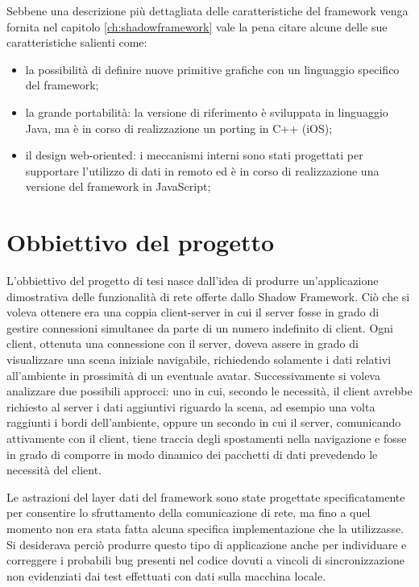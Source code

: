 Sebbene una descrizione pi\`u dettagliata delle caratteristiche del framework venga fornita nel capitolo \ref{ch:shadowframework} vale la pena citare alcune delle sue caratteristiche salienti come: 
\begin{itemize}
	\item  la possibilit\`a di definire nuove primitive grafiche con un linguaggio specifico del framework;
	\item  la grande portabilit\`a: la versione di riferimento \`e sviluppata in linguaggio Java, ma \`e in corso di realizzazione un porting in C++ (iOS);
	\item  il design web-oriented: i meccanismi interni sono stati progettati per supportare l'utilizzo di dati in remoto ed \`e in corso di realizzazione una versione del framework in JavaScript;
\end{itemize}

%
%
\section{Obbiettivo del progetto}
\label{sec:obbiettivo}
L'obbiettivo del progetto di tesi nasce dall'idea di produrre un'applicazione dimostrativa delle funzionalit\`a di rete offerte dallo Shadow Framework.
Ci\`o che si voleva ottenere era una coppia client-server in cui il server fosse in grado di gestire connessioni simultanee da parte di un numero indefinito di client. 
Ogni client, ottenuta una connessione con il server, doveva assere in grado di visualizzare una scena iniziale navigabile, richiedendo solamente i dati relativi all'ambiente in prossimit\`a di un eventuale avatar.
Successivamente si voleva analizzare due possibili approcci: uno in cui, secondo le necessit\`a, il client avrebbe richiesto al server i dati aggiuntivi riguardo la scena, ad esempio una volta raggiunti i bordi dell'ambiente, oppure un secondo in cui il server, comunicando attivamente con il client, tiene traccia degli spostamenti nella navigazione e fosse in grado di comporre in modo dinamico dei pacchetti di dati prevedendo le necessit\`a del client.

Le astrazioni del layer dati del framework sono state progettate specificatamente per consentire lo sfruttamento della comunicazione di rete, ma fino a quel momento non era stata fatta alcuna specifica implementazione che la utilizzasse. Si desiderava perci\`o produrre questo tipo di applicazione anche per individuare e correggere i probabili bug presenti nel codice dovuti a vincoli di sincronizzazione non evidenziati dai test effettuati con dati sulla macchina locale.

